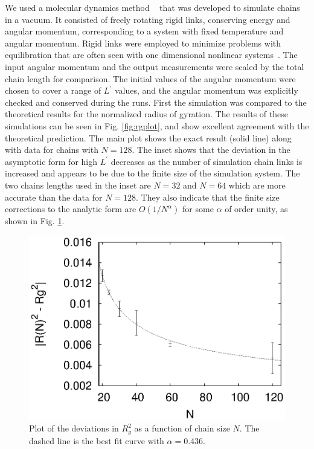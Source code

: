 \documentclass[pre,showpacs]{revtex4}
\begin{document}
We used a molecular dynamics method ~\cite{DeutschCerf} that was developed to simulate chains in a vacuum. It
consisted of freely rotating rigid links, conserving energy and angular
momentum, corresponding to a system with fixed temperature and angular momentum. Rigid links were employed to minimize problems with equilibration that are often seen with one dimensional nonlinear systems~\cite{FPU,BermanIzrailev}. The input angular momentum and the output measurements were
scaled by the total chain length for comparison. The initial values of
the angular momentum were chosen to cover a range of $L^\prime$ values, and the
angular momentum was explicitly checked and conserved during the runs.
First the simulation was compared to the theoretical results for the
normalized radius of gyration. The results of these simulations can be
seen in Fig. \ref{fig:rgplot}, and show excellent agreement with the
theoretical prediction. The main plot shows the exact result (solid line)
along with data for chains with $N=128$. The inset shows that the deviation in the asymptotic form for high
$L^\prime$ decreases as the number of simulation chain links is increased and
appears to be due to the finite size of the simulation system. The two chains lengths
used in the inset are $N=32$ and $N=64$ which are more accurate than the data
for $N=128$. They also indicate that the finite size corrections to the
analytic form are $O(1/N^\alpha)$ for some $\alpha$ of order unity, as shown in Fig. \ref{fig:scalen}.
\begin{figure}
\begin{center}
\includegraphics[width=\hsize]{scalen}
\caption{Plot of the deviations in $R_g^2$ as a function of chain size $N$. The dashed line is the best fit curve with $\alpha = 0.436$.}
\label{fig:scalen}
\end{center}
\end{figure}
\end{document}
